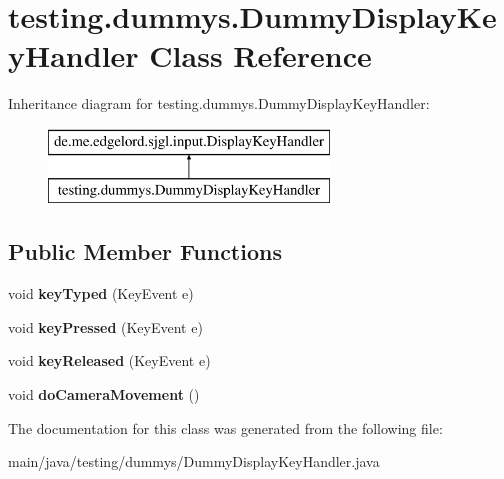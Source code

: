 \hypertarget{classtesting_1_1dummys_1_1_dummy_display_key_handler}{}\section{testing.\+dummys.\+Dummy\+Display\+Key\+Handler Class Reference}
\label{classtesting_1_1dummys_1_1_dummy_display_key_handler}
Inheritance diagram for testing.\+dummys.\+Dummy\+Display\+Key\+Handler\+:\begin{figure}[H]
\begin{center}
\leavevmode
\includegraphics[height=2.000000cm]{classtesting_1_1dummys_1_1_dummy_display_key_handler}
\end{center}
\end{figure}
\subsection*{Public Member Functions}
\begin{DoxyCompactItemize}
\item 
\mbox{\label{classtesting_1_1dummys_1_1_dummy_display_key_handler_a09a606b736f3449499494ac713ec5c64}} 
void {\bfseries key\+Typed} (Key\+Event e)
\item 
\mbox{\label{classtesting_1_1dummys_1_1_dummy_display_key_handler_a6df4691a1a0c46ec9d8d88a76270f83d}} 
void {\bfseries key\+Pressed} (Key\+Event e)
\item 
\mbox{\label{classtesting_1_1dummys_1_1_dummy_display_key_handler_ab7208b311176d708712d6294cb31b00b}} 
void {\bfseries key\+Released} (Key\+Event e)
\item 
\mbox{\label{classtesting_1_1dummys_1_1_dummy_display_key_handler_aa9779ffc62641e7d7b112455f40e4824}} 
void {\bfseries do\+Camera\+Movement} ()
\end{DoxyCompactItemize}


The documentation for this class was generated from the following file\+:\begin{DoxyCompactItemize}
\item 
main/java/testing/dummys/Dummy\+Display\+Key\+Handler.\+java\end{DoxyCompactItemize}
